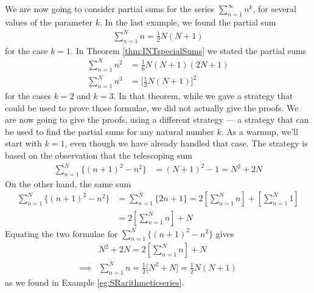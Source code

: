 \begin{eg}\label{eg:SRpowerseries}
We are now going to consider partial sums for the series $\sum_{n=1}^\infty n^k$, for several values of 
the parameter $k$. In the last example, we found the partial sum
\begin{align*}
\sum_{n=1}^N n = \tfrac{1}{2}N(N+1)
\end{align*}
for the case $k=1$. 
In Theorem \ref{thm:INTspecialSums} we stated the partial sums
\begin{align*}
\sum_{n=1}^N n^2 &= \tfrac{1}{6}N(N+1)(2N+1) \\
\sum_{n=1}^N n^3 &= \Big[\tfrac{1}{2}N(N+1)\Big]^2
\end{align*}
for the cases $k=2$ and $k=3$. In that theorem, while we gave a strategy that could be used to prove those 
formulae, we did not actually give the proofs. We are now going to give the proofs, using a different strategy
--- a strategy that can be used to find the partial sums for any natural number $k$. As a warmup, we'll 
start with $k=1$, even though we have already handled that case. The strategy is based on the observation 
that the telescoping sum
\begin{align*}
\sum_{n=1}^N \big\{(n+1)^2 -n^2\big\} &= (N+1)^2 -1 = N^2+2N
\end{align*}  
On the other hand, the same sum
\begin{align*}
\sum_{n=1}^N \big\{(n+1)^2 -n^2\big\} &= \sum_{n=1}^N \big\{2n+1\big\} 
                                       = 2\left[\sum_{n=1}^N n\right] + \left[\sum_{n=1}^N 1\right] \\
                                      &= 2\left[\sum_{n=1}^N n\right] + N
\end{align*}  
Equating the two formulae for $\sum_{n=1}^N \big\{(n+1)^2 -n^2\big\}$ gives
\begin{align*}
&N^2+2N = 2\left[\sum_{n=1}^N n\right] + N \\
\implies &\sum_{n=1}^N n = \tfrac{1}{2}\big[N^2+N\big]
                         =\tfrac{1}{2} N (N+1)
\end{align*}  
as we found in Example \ref{eg:SRarithmeticseries}.


\end{eg}
